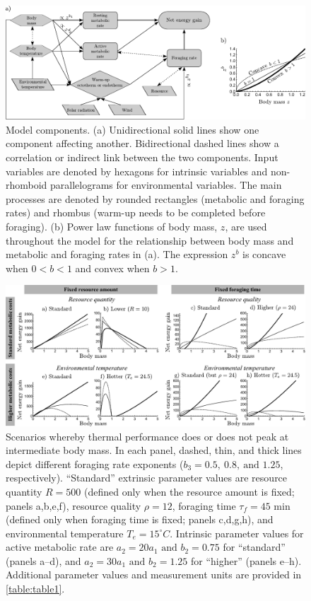 \clearpage

\begin{figure}
\includegraphics[width=\textwidth]{fig1}
\caption{
    \setstretch{\stretchby}
    Model components.
    (a) Unidirectional solid lines show one component affecting another.
    Bidirectional dashed lines show a correlation or indirect link between the two components.
    Input variables are denoted by hexagons for intrinsic variables and non-rhomboid parallelograms for environmental variables.
    The main processes are denoted by rounded rectangles (metabolic and foraging rates)  and rhombus (warm-up needs to be completed before foraging).
    (b) Power law functions of body mass, $z$, are used throughout the model for the relationship between body mass and metabolic and foraging rates in (a).
    The expression $z^b$ is concave when $0 < b < 1$ and convex when $b > 1$.
}
\label{fig1}
\end{figure}

\begin{figure}
\includegraphics[width=\textwidth]{fig2}
\caption{
    \setstretch{\stretchby}
    Scenarios whereby thermal performance does or does not peak at intermediate body mass.
    In each panel, dashed, thin, and thick lines depict different foraging rate exponents ($b_3 = 0.5,\ 0.8,\ \text{and } 1.25$, respectively).
    ``Standard'' extrinsic parameter values are
    resource quantity $R = 500$ (defined only when the resource amount is fixed; panels a,b,e,f),
    resource quality $\rho = 12$,
    foraging time $\tau_f = 45 \text{ min}$ (defined only when foraging time is fixed; panels c,d,g,h),
    and environmental temperature $T_e = 15^\circ C$.
    Intrinsic parameter values for active metabolic rate are $a_2 = 20 a_1 \text{ and } b_2 = 0.75$ for ``standard'' (panels a--d), and $a_2 = 30 a_1 \text{ and } b_2  = 1.25$ for ``higher'' (panels e--h).
    Additional parameter values and measurement units are provided in \cref{table:table1}.
}
\label{fig2}
\end{figure}

